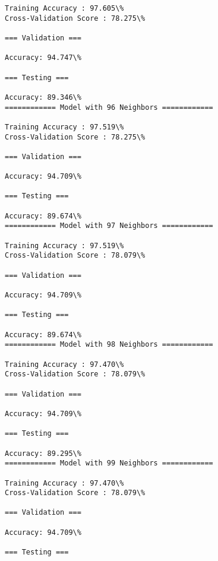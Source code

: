 \documentclass[11pt]{article}
\begin{document}
\begin{Verbatim}[commandchars=\\\{\}]
Training Accuracy : 97.605\%
Cross-Validation Score : 78.275\%

=== Validation ===

Accuracy: 94.747\%

=== Testing ===

Accuracy: 89.346\%
============ Model with 96 Neighbors ============

Training Accuracy : 97.519\%
Cross-Validation Score : 78.275\%

=== Validation ===

Accuracy: 94.709\%

=== Testing ===

Accuracy: 89.674\%
============ Model with 97 Neighbors ============

Training Accuracy : 97.519\%
Cross-Validation Score : 78.079\%

=== Validation ===

Accuracy: 94.709\%

=== Testing ===

Accuracy: 89.674\%
============ Model with 98 Neighbors ============

Training Accuracy : 97.470\%
Cross-Validation Score : 78.079\%

=== Validation ===

Accuracy: 94.709\%

=== Testing ===

Accuracy: 89.295\%
============ Model with 99 Neighbors ============

Training Accuracy : 97.470\%
Cross-Validation Score : 78.079\%

=== Validation ===

Accuracy: 94.709\%

=== Testing ===


\end{Verbatim}
\end{document}
